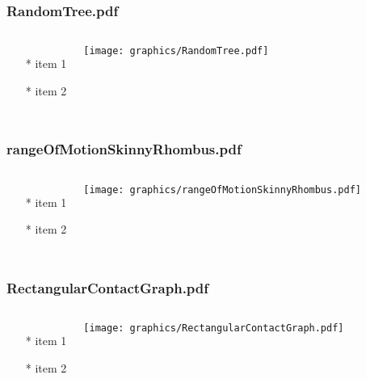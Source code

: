 \documentclass{beamer}
\begin{document}
\begin{frame} \frametitle{RandomTree.pdf}
    \begin{columns}[c]
        \begin{itemize}
            \item[*] item 1
            \item[*] item 2
        \end{itemize}
        \begin{minipage}{\linewidth}
            \begin{center}
            \texttt{[image: graphics/RandomTree.pdf]}
            \label{gfx:RandomTree.pdf}
            \end{center}
        \end{minipage}
    \end{columns}
\end{frame}
\begin{frame} \frametitle{rangeOfMotionSkinnyRhombus.pdf}
    \begin{columns}[c]
        \begin{itemize}
            \item[*] item 1
            \item[*] item 2
        \end{itemize}
        \begin{minipage}{\linewidth}
            \begin{center}
            \texttt{[image: graphics/rangeOfMotionSkinnyRhombus.pdf]}
            \label{gfx:rangeOfMotionSkinnyRhombus.pdf}
            \end{center}
        \end{minipage}
    \end{columns}
\end{frame}
\begin{frame} \frametitle{RectangularContactGraph.pdf}
    \begin{columns}[c]
        \begin{itemize}
            \item[*] item 1
            \item[*] item 2
        \end{itemize}
        \begin{minipage}{\linewidth}
            \begin{center}
            \texttt{[image: graphics/RectangularContactGraph.pdf]}
            \label{gfx:RectangularContactGraph.pdf}
            \end{center}
        \end{minipage}
    \end{columns}
\end{frame}
\end{document}
